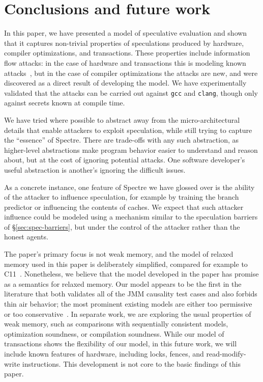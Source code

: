 \section{Conclusions and future work}

In this paper, we have presented a model of speculative evaluation and
shown that it captures non-trivial properties of speculations produced
by hardware, compiler optimizations, and transactions. These properties
include information flow attacks: in the case of hardware and transactions
this is modeling known attacks~\cite{DBLP:journals/corr/abs-1801-01203,DBLP:conf/uss/DisselkoenKPT17},
but in the case of compiler optimizations the attacks are new, and were
discovered as a direct result of developing the model. We have experimentally
validated that the attacks can be carried out against \verb|gcc| and \verb|clang|,
though only against secrets known at compile time.

We have tried where possible to abstract away from the
micro-architectural details that enable attackers to exploit
speculation, while still trying to capture the ``essence'' of
Spectre. There are trade-offs with any such abstraction, as
higher-level abstractions make program behavior easier to understand
and reason about, but at the cost of ignoring potential attacks. One
software developer's useful abstraction is another's ignoring the
difficult issues.

As a concrete instance, one feature of Spectre we have glossed over is
the ability of the attacker to influence speculation, for example by
training the branch predictor or influencing the contents of caches.
We expect that such attacker influence could be modeled using a
mechanism similar to the speculation barriers of \S\ref{sec:spec-barriers},
but under the control of the attacker rather than the honest agents.

The paper's primary focus is not weak memory, and the model of relaxed
memory used in this paper is deliberately simplified, compared for
example to
C11~\cite{Boehm:2008:FCC:1375581.1375591,Batty:2011:MCC:1926385.1926394}. Nonetheless,
we believe that the model developed in the paper has promise as a
semantics for relaxed memory. Our model appears to be the first in the
literature that both validates all of the JMM causality test cases and
also forbids thin air behavior; the most prominent existing models are
either too permissive~\cite{Manson:2005:JMM:1047659.1040336,
  Jagadeesan:2010:GOS:2175486.2175503,Kang-promising-2017} or
too conservative~\cite{DBLP:conf/lics/JeffreyR16}.  In separate work,
we are exploring the usual properties of weak memory, such as
comparisons with sequentially consistent models,
optimization soundness, or compilation soundness.  While our model of
transactions shows the flexibility of our model, in this future work,
we will include known features of hardware, including locks, fences,
and read-modify-write instructions.  This development is not core to
the basic findings of this paper.



